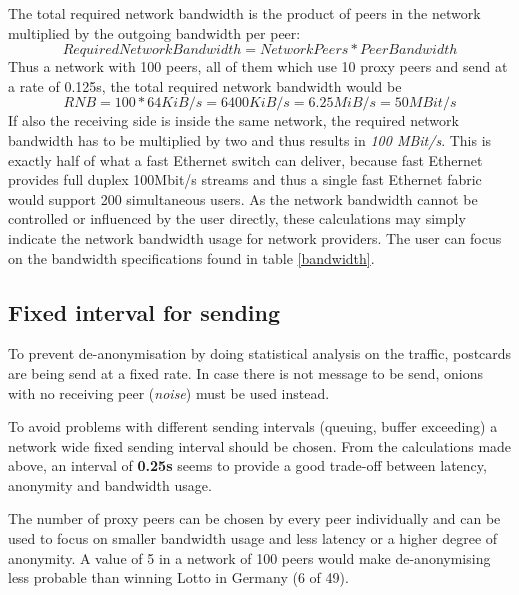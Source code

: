 The total required network bandwidth is the product of peers in the
network multiplied by the outgoing bandwidth per peer:
$$Required Network Bandwidth = Network Peers * Peer Bandwidth$$
Thus a network with 100 peers, all of them which use 10 proxy peers
and send at a rate of 0.125s, the total required network bandwidth would be
$$RNB = 100 * 64 KiB/s = 6400 KiB/s = 6.25MiB/s = 50 MBit/s$$
If also the receiving side is inside the same network, the required network
bandwidth has to be multiplied by two and thus results in 
\textit{100 MBit/s}. This is exactly half of what a fast Ethernet switch
can deliver, because fast Ethernet provides full duplex 100Mbit/s streams
and thus a single fast Ethernet fabric would support 200 simultaneous users.
As the network bandwidth cannot be controlled or influenced by the user
directly, these calculations may simply indicate the network bandwidth
usage for network providers. The user can focus on the bandwidth specifications
found in table \ref{bandwidth}.
\subsection{Fixed interval for sending}
To prevent de-anonymisation by doing statistical analysis on the traffic,
postcards are being send at a fixed rate.
In case there is not message to be send, onions with no receiving
peer (\textit{noise}) must be used instead.

To avoid problems with different sending intervals
(queuing, buffer exceeding) a network wide fixed sending interval
should be chosen. From the calculations made above, an interval
of \textbf{0.25s} seems to provide a good trade-off between
latency, anonymity and bandwidth usage.

The number of proxy peers can be chosen by every peer individually
and can be used to focus on smaller bandwidth usage and less latency
or a higher degree of anonymity. A value of 5 in a network of 100 peers
would make de-anonymising less probable than winning Lotto in Germany
(6 of 49).
